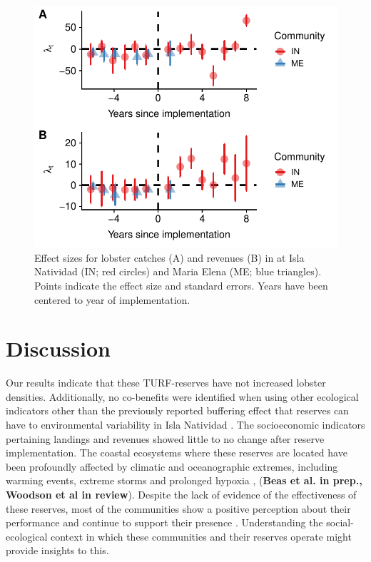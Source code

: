 \documentclass{frontiersSCNS}
\theoremstyle{definition}
\theoremstyle{definition}
\theoremstyle{definition}
\theoremstyle{remark}
\begin{document}
\begin{figure}
\centering
\includegraphics{Villasenor-Derbez_files/figure-latex/unnamed-chunk-6-1.pdf}
\caption{\label{fig:unnamed-chunk-6}\label{fig:lobsters}Effect sizes for
lobster catches (A) and revenues (B) in at Isla Natividad (IN; red
circles) and Maria Elena (ME; blue triangles). Points indicate the
effect size and standard errors. Years have been centered to year of
implementation.}
\end{figure}

\section{Discussion}\label{discussion}

Our results indicate that these TURF-reserves have not increased lobster
densities. Additionally, no co-benefits were identified when using other
ecological indicators other than the previously reported buffering
effect that reserves can have to environmental variability in Isla
Natividad \citep{micheli_2012-EU}. The socioeconomic indicators
pertaining landings and revenues showed little to no change after
reserve implementation. The coastal ecosystems where these reserves are
located have been profoundly affected by climatic and oceanographic
extremes, including warming events, extreme storms and prolonged hypoxia
\citep{micheli_2012-EU}, (\textbf{Beas et al. in prep., Woodson et al in
review}). Despite the lack of evidence of the effectiveness of these
reserves, most of the communities show a positive perception about their
performance and continue to support their presence \citep{ayer_2018}.
Understanding the social-ecological context in which these communities
and their reserves operate might provide insights to this.
\end{document}
